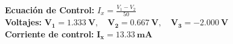 \documentclass[11pt, a4paper]{article}
\begin{document}
\begin{tcolorbox}[caja_solucion, title=Respuestas de Autocontrol (Ejercicio 2)]
\textbf{Ecuación de Control:} $I_x = \frac{V_1 - V_2}{50}$ \\
\textbf{Voltajes:} $\mathbf{V_1 = \qty{1.333}{\volt}}, \quad \mathbf{V_2 = \qty{0.667}{\volt}}, \quad \mathbf{V_3 = \qty{-2.000}{\volt}}$ \\
\textbf{Corriente de control:} $\mathbf{I_x = \qty{13.33}{\milli\ampere}}$
\end{tcolorbox}
\end{document}
